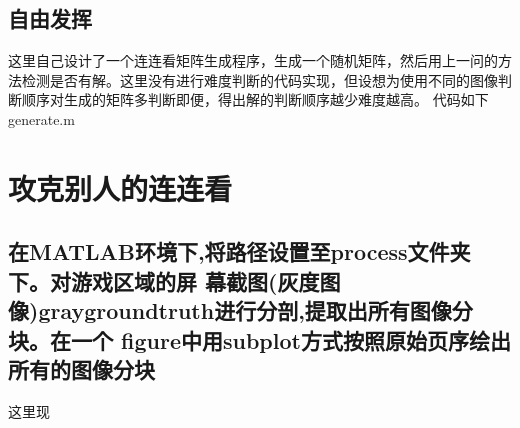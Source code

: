 \documentclass{ctexart}
\begin{document}
\subsection{自由发挥}
这里自己设计了一个连连看矩阵生成程序，生成一个随机矩阵，然后用上一问的方法检测是否有解。这里没有进行难度判断的代码实现，但设想为使用不同的图像判断顺序对生成的矩阵多判断即便，得出解的判断顺序越少难度越高。
代码如下generate.m

\section{攻克别人的连连看}
\subsection{ 
在MATLAB环境下,将路径设置至process文件夹下。对游戏区域的屏
幕截图(灰度图像)graygroundtruth进行分剖,提取出所有图像分块。在一个
figure中用subplot方式按照原始页序绘出所有的图像分块}
这里现
\end{document}
